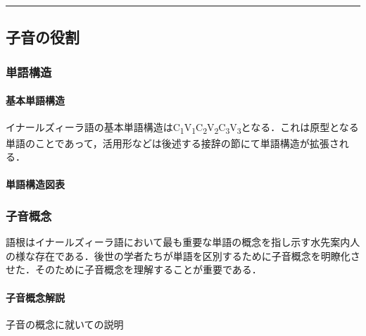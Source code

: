 \documentclass[
  japanese,
]{article}
\begin{document}
\begin{center}\rule{0.5\linewidth}{0.5pt}\end{center}

\subsection{子音の役割}\label{chapter4}

\subsubsection{単語構造}\label{section4.1}

\paragraph{基本単語構造}\label{subsection4.1.1}

イナールズィーラ語の基本単語構造はC\textsubscript{1}V\textsubscript{1}C\textsubscript{2}V\textsubscript{2}C\textsubscript{3}V\textsubscript{3}となる．これは原型となる単語のことであって，活用形などは後述する接辞の節にて単語構造が拡張される．

\paragraph{単語構造図表}\label{subsection4.1.2}

\subsubsection{子音概念}\label{section4.2}

語根はイナールズィーラ語において最も重要な単語の概念を指し示す水先案内人の様な存在である．後世の学者たちが単語を区別するために子音概念を明瞭化させた．そのために子音概念を理解することが重要である．

\paragraph{子音概念解説}\label{subsection4.2.1}

子音の概念に就いての説明
\end{document}
